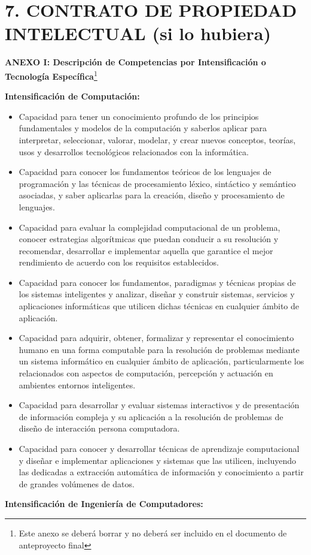 \documentclass[a4paper]{article}
\newcommand\textstyleStrongEmphasis[1]{\textbf{#1}}
\newcommand\liststyleLvii{%
\renewcommand\labelitemi{{\textbullet}}
\renewcommand\labelitemii{{\textbullet}}
\renewcommand\labelitemiii{{\textbullet}}
\renewcommand\labelitemiv{{\textbullet}}
}
\begin{document}
\section{7. CONTRATO DE PROPIEDAD INTELECTUAL (si lo hubiera)}

\bigskip

\clearpage\clearpage\pagestyle{plain}
\thispagestyle{FirstPage}
{\centering
\textstyleStrongEmphasis{ANEXO I: Descripci\'on de Competencias por Intensificaci\'on o Tecnolog\'ia
Espec\'ifica}\footnote{Este anexo se deber\'a borrar y no deber\'a ser incluido en el documento de anteproyecto final}
\par}

{\bfseries
Intensificaci\'on de Computaci\'on:}

\liststyleLvii
\begin{itemize}
\item Capacidad para tener un conocimiento profundo de los principios fundamentales y modelos de la computaci\'on y
saberlos aplicar para interpretar, seleccionar, valorar, modelar, y crear nuevos conceptos, teor\'ias, usos y
desarrollos tecnol\'ogicos relacionados con la inform\'atica.
\item Capacidad para conocer los fundamentos te\'oricos de los lenguajes de programaci\'on y las t\'ecnicas de
procesamiento l\'exico, sint\'actico y sem\'antico asociadas, y saber aplicarlas para la creaci\'on, dise\~no y
procesamiento de lenguajes.
\item Capacidad para evaluar la complejidad computacional de un problema, conocer estrategias algor\'itmicas que puedan
conducir a su resoluci\'on y recomendar, desarrollar e implementar aquella que garantice el mejor rendimiento de
acuerdo con los requisitos establecidos.
\item Capacidad para conocer los fundamentos, paradigmas y t\'ecnicas propias de los sistemas inteligentes y analizar,
dise\~nar y construir sistemas, servicios y aplicaciones inform\'aticas que utilicen dichas t\'ecnicas en cualquier
\'ambito de aplicaci\'on.
\item Capacidad para adquirir, obtener, formalizar y representar el conocimiento humano en una forma computable para la
resoluci\'on de problemas mediante un sistema inform\'atico en cualquier \'ambito de aplicaci\'on, particularmente los
relacionados con aspectos de computaci\'on, percepci\'on y actuaci\'on en ambientes entornos inteligentes.
\item Capacidad para desarrollar y evaluar sistemas interactivos y de presentaci\'on de informaci\'on compleja y su
aplicaci\'on a la resoluci\'on de problemas de dise\~no de interacci\'on persona computadora.
\item Capacidad para conocer y desarrollar t\'ecnicas de aprendizaje computacional y dise\~nar e implementar
aplicaciones y sistemas que las utilicen, incluyendo las dedicadas a extracci\'on autom\'atica de informaci\'on y
conocimiento a partir de grandes vol\'umenes de datos.
\end{itemize}
{\bfseries
Intensificaci\'on de Ingenier\'ia de Computadores:}
\end{document}
